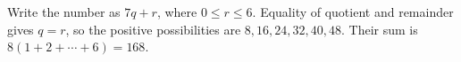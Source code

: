 Write the number as $7q+r$, where $0\le r\le6$. Equality of quotient and remainder gives $q=r$, so the positive possibilities are $8,16,24,32,40,48$. Their sum is $8(1+2+\cdots+6)=\boxed{168}$.
